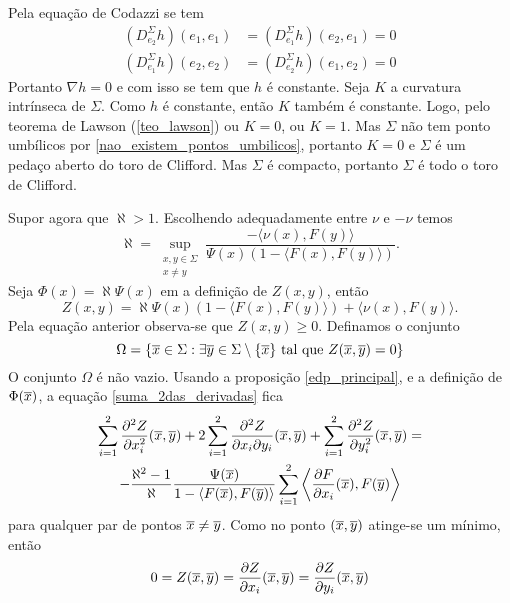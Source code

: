 Pela equação de Codazzi se tem
\begin{align*}
	(D_{e_2}^{\Sigma} h) (e_1,e_1) &= (D_{e_1}^{\Sigma} h) (e_2,e_1) = 0\\
	(D_{e_1}^{\Sigma} h) (e_2,e_2) &= (D_{e_2}^{\Sigma} h) (e_1,e_2) = 0
\end{align*}
Portanto $\nabla h = 0$ e com isso se tem que $h$ é constante. Seja $K$ a curvatura intrínseca de $\Sigma$. Como $h$ é constante, então $K$ também é constante. Logo, pelo teorema de Lawson (\ref{teo_lawson}) ou $K=0$, ou $K=1$. Mas $\Sigma$ não tem ponto umbílicos por \ref{nao_existem_pontos_umbilicos}, portanto $K=0$ e $\Sigma$ é um pedaço aberto do toro de Clifford. Mas $\Sigma$ é compacto, portanto $\Sigma$ é todo o toro de Clifford.

Supor agora que $\aleph > 1$. Escolhendo adequadamente entre $\nu$ e $-\nu$ temos
\begin{equation*}
	\aleph = \sup_{\substack{x,y \in \Sigma\\ x \neq y}} \frac{- \langle \nu(x), F(y) \rangle}{\Psi(x)(1 - \langle F(x), F(y) \rangle)}.
\end{equation*}
Seja $\Phi(x) = \aleph \Psi(x)$ em a definição de $Z(x,y)$, então
\begin{equation*}
	Z(x,y) = \aleph \Psi(x)(1 - \langle F(x), F(y) \rangle) + \langle \nu(x), F(y) \rangle.
\end{equation*}
Pela equação anterior observa-se que $Z(x,y) \geq 0$.
Definamos o conjunto
\begin{equation*}
	\Omega = \{ \overline{x} \in \Sigma: \exists \overline{y} \in \Sigma \setminus \{\overline{x}\} \text{ tal que } Z(\overline{x},\overline{y}) = 0 \}
\end{equation*}
O conjunto $\Omega$ é não vazio.
Usando a proposição \eqref{edp_principal}, e a definição de $\Phi(\overline{x})$, a equação \eqref{suma_2das_derivadas} fica
\begin{multline}\label{suma_2da_der_aleph}
\sum_{i=1}^2 \frac{\partial^2 Z}{\partial x_i^2}(\overline{x},\overline{y}) + 2 \sum_{i=1}^2 \frac{\partial^2 Z}{\partial x_i \partial y_i}(\overline{x},\overline{y}) + \sum_{i=1}^2 \frac{\partial^2 Z}{\partial y_i^2}(\overline{x},\overline{y}) =\\
- \frac{\aleph^2 - 1}{\aleph} \frac{\Psi(\overline{x})}{1 - \langle F(\overline{x}), F(\overline{y}) \rangle} \sum_{i=1}^2 \left\langle \frac{\partial F}{\partial x_i}(\overline{x}), F(\overline{y}) \right\rangle
\end{multline}
para qualquer par de pontos $\overline{x} \neq \overline{y}$. Como no ponto $(\overline{x},\overline{y})$ atinge-se um mínimo, então
\begin{equation*}
	0 = Z(\overline{x},\overline{y}) = \frac{\partial Z}{\partial x_i}(\overline{x},\overline{y}) = \frac{\partial Z}{\partial y_i}(\overline{x},\overline{y})
\end{equation*}

